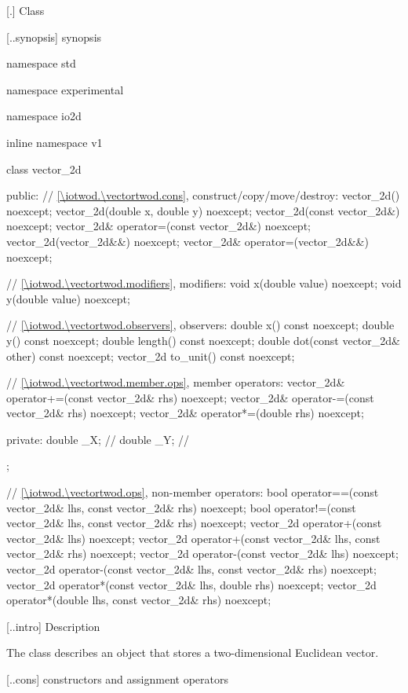  [\iotwod.\vectortwod] {Class }

 [\iotwod.\vectortwod.synopsis] { synopsis}

\begin{codeblock}
namespace std { namespace experimental { namespace io2d { inline namespace v1 {
  class vector_2d {
  public:
    // \ref{\iotwod.\vectortwod.cons}, construct/copy/move/destroy:
    vector_2d() noexcept;
    vector_2d(double x, double y) noexcept;
    vector_2d(const vector_2d&) noexcept;
    vector_2d& operator=(const vector_2d&) noexcept;
    vector_2d(vector_2d&&) noexcept;
    vector_2d& operator=(vector_2d&&) noexcept;

    // \ref{\iotwod.\vectortwod.modifiers}, modifiers:
    void x(double value) noexcept;
    void y(double value) noexcept;
    
    // \ref{\iotwod.\vectortwod.observers}, observers:
    double x() const noexcept;
    double y() const noexcept;
    double length() const noexcept;
    double dot(const vector_2d& other) const noexcept;
    vector_2d to_unit() const noexcept;
    
    // \ref{\iotwod.\vectortwod.member.ops}, member operators:
    vector_2d& operator+=(const vector_2d& rhs) noexcept;
    vector_2d& operator-=(const vector_2d& rhs) noexcept;
    vector_2d& operator*=(double rhs) noexcept;
    
  private:
    double _X; // \expos
    double _Y; // \expos
  };
  
  // \ref{\iotwod.\vectortwod.ops}, non-member operators:
  bool operator==(const vector_2d& lhs, const vector_2d& rhs) noexcept;
  bool operator!=(const vector_2d& lhs, const vector_2d& rhs) noexcept;
  vector_2d operator+(const vector_2d& lhs) noexcept;
  vector_2d operator+(const vector_2d& lhs, const vector_2d& rhs) noexcept;
  vector_2d operator-(const vector_2d& lhs) noexcept;
  vector_2d operator-(const vector_2d& lhs, const vector_2d& rhs) noexcept;
  vector_2d operator*(const vector_2d& lhs, double rhs) noexcept;
  vector_2d operator*(double lhs, const vector_2d& rhs) noexcept;
} } } }
\end{codeblock}

 [\iotwod.\vectortwod.intro] { Description}

\pnum
{}
The class  describes an object that stores a two-dimensional Euclidean vector.

 [\iotwod.\vectortwod.cons] { constructors and assignment operators}

